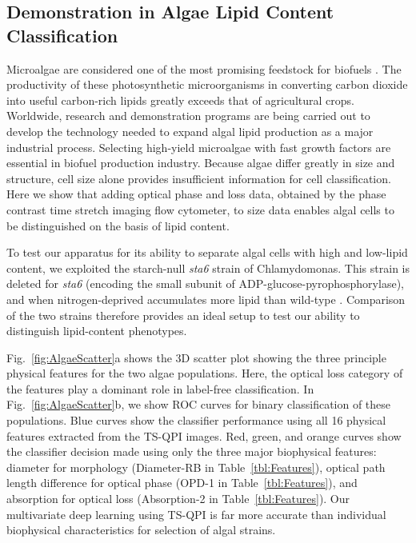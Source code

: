 \documentclass[aps,pra,reprint,superscriptaddress]{revtex4-1}
\begin{document}
\subsection*{Demonstration in Algae Lipid Content Classification}

Microalgae are considered one of the most promising feedstock for biofuels \cite{merchant2012tag}. The productivity of these photosynthetic microorganisms in converting carbon dioxide into useful carbon-rich lipids greatly exceeds that of agricultural crops. Worldwide, research and demonstration programs are being carried out to develop the technology needed to expand algal lipid production as a major industrial process. Selecting high-yield microalgae with fast growth factors are essential in biofuel production industry. Because algae differ greatly in size and structure, cell size alone provides insufficient information for cell classification. Here we show that adding optical phase and loss data, obtained by the phase contrast time stretch imaging flow cytometer, to size data enables algal cells to be distinguished on the basis of lipid content. 

To test our apparatus for its ability to separate algal cells with high and low-lipid content, we exploited the starch-null \textit{sta6} strain of Chlamydomonas. This strain is deleted for \textit{sta6} \cite{zabawinski2001starchless} (encoding the small subunit of ADP-glucose-pyrophosphorylase), and when nitrogen-deprived accumulates more lipid than wild-type \cite{work2010increased, li2010chlamydomonas, goodenough2014path, blaby2013systems}. Comparison of the two strains therefore provides an ideal setup to test our ability to distinguish lipid-content phenotypes.

Fig.~\ref{fig:AlgaeScatter}a shows the 3D scatter plot showing the three principle physical features for the two algae populations. Here, the optical loss category of the features play a dominant role in label-free classification. In Fig.~\ref{fig:AlgaeScatter}b, we show ROC curves for binary classification of these populations. Blue curves show the classifier performance using all 16 physical features extracted from the TS-QPI images. Red, green, and orange curves show the classifier decision made using only the three major biophysical features: diameter for morphology (Diameter-RB in Table~\ref{tbl:Features}), optical path length difference for optical phase (OPD-1 in Table~\ref{tbl:Features}), and absorption for optical loss (Absorption-2 in Table~\ref{tbl:Features}). Our multivariate deep learning using TS-QPI is far more accurate than individual biophysical characteristics for selection of algal strains.
\end{document}
